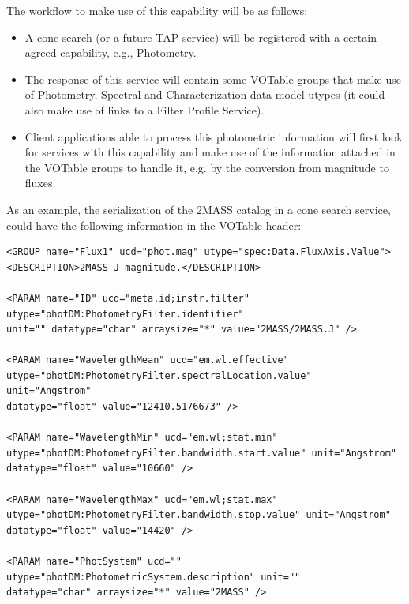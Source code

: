 \documentclass[11pt,a4paper]{ivoa}
\begin{document}
\begin{appendices}
The workflow to make use of this capability will be as follows:
\par

\begin{itemize}
	\item A cone search (or a future TAP service) will be registered with a certain agreed capability, e.g., Photometry.\par

	\item The response of this service will contain some VOTable groups that make use of Photometry, Spectral and Characterization data model utypes (it could also make use of links to a Filter Profile Service).\par

	\item Client applications able to process this photometric information will first look for services with this capability and make use of the information attached in the VOTable groups to handle it, e.g. by the conversion from magnitude to fluxes.
\end{itemize}\par

As an example, the serialization of the 2MASS catalog in a cone search service, could have the following information in the VOTable header:
\par

\begin{verbatim}
<GROUP name="Flux1" ucd="phot.mag" utype="spec:Data.FluxAxis.Value">
<DESCRIPTION>2MASS J magnitude.</DESCRIPTION>

<PARAM name="ID" ucd="meta.id;instr.filter"
utype="photDM:PhotometryFilter.identifier"
unit="" datatype="char" arraysize="*" value="2MASS/2MASS.J" />

<PARAM name="WavelengthMean" ucd="em.wl.effective"
utype="photDM:PhotometryFilter.spectralLocation.value"
unit="Angstrom"
datatype="float" value="12410.5176673" />

<PARAM name="WavelengthMin" ucd="em.wl;stat.min"
utype="photDM:PhotometryFilter.bandwidth.start.value" unit="Angstrom"
datatype="float" value="10660" />

<PARAM name="WavelengthMax" ucd="em.wl;stat.max"
utype="photDM:PhotometryFilter.bandwidth.stop.value" unit="Angstrom"
datatype="float" value="14420" />

<PARAM name="PhotSystem" ucd="" utype="photDM:PhotometricSystem.description" unit=""
datatype="char" arraysize="*" value="2MASS" />


\end{verbatim}
\end{appendices}
\end{document}
